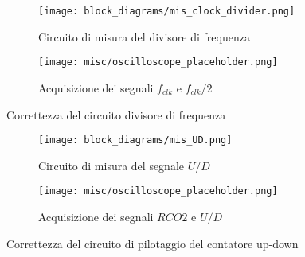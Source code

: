 \begin{figure}[ht]
    \centering

    \begin{subfigure}{.5\textwidth}
        \centering
        \texttt{[image: block\_diagrams/mis\_clock\_divider.png]}
        \caption{Circuito di misura del divisore di frequenza}
        \label{mis_clock_divider}
    \end{subfigure}%
    \begin{subfigure}{.5\textwidth}
        \centering
        \texttt{[image: misc/oscilloscope\_placeholder.png]}
        \caption{Acquisizione dei segnali $f_{clk}$ e $f_{clk}/2$}
        \label{acq_clock_divider}
    \end{subfigure}

    \caption{Correttezza del circuito divisore di frequenza}
    \label{clock_divider}
\end{figure}

\begin{figure}[ht]
    \centering

    \begin{subfigure}{.5\textwidth}
        \centering
        \texttt{[image: block\_diagrams/mis\_UD.png]}
        \caption{Circuito di misura del segnale $U/D$}
        \label{mis_UD}
    \end{subfigure}%
    \begin{subfigure}{.5\textwidth}
        \centering
        \texttt{[image: misc/oscilloscope\_placeholder.png]}
        \caption{Acquisizione dei segnali $RCO2$ e $U/D$}
        \label{acq_UD}
    \end{subfigure}

    \caption{Correttezza del circuito di pilotaggio del contatore up-down}
    \label{UD}
\end{figure}